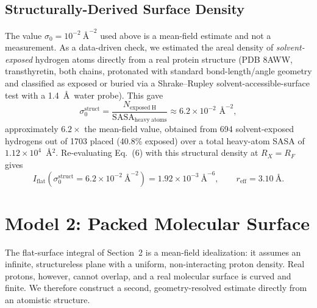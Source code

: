 \documentclass[11pt]{article}
\begin{document}
\subsection{Structurally-Derived Surface Density}
The value $\sigma_0 = 10^{-2}~\text{\AA}^{-2}$ used above is a mean-field estimate and not a measurement. As a data-driven check, we estimated the areal density of \emph{solvent-exposed} hydrogen atoms directly from a real protein structure (PDB 8AWW, transthyretin, both chains, protonated with standard bond-length/angle geometry and classified as exposed or buried via a Shrake--Rupley solvent-accessible-surface test with a 1.4~\AA\ water probe). This gave
\begin{equation}
\sigma_0^{\mathrm{struct}} = \frac{N_{\mathrm{exposed\ H}}}{\mathrm{SASA}_{\mathrm{heavy\ atoms}}} \approx 6.2 \times 10^{-2} \text{ \AA}^{-2},
\end{equation}
approximately $6.2\times$ the mean-field value, obtained from 694 solvent-exposed hydrogens out of 1703 placed (40.8\% exposed) over a total heavy-atom SASA of $1.12\times10^4$~\AA$^2$. Re-evaluating Eq.~(6) with this structural density at $R_X = R_F$ gives
\begin{equation}
I_{\mathrm{flat}}(\sigma_0^{\mathrm{struct}} = 6.2\times10^{-2}~\text{\AA}^{-2}) = 1.92\times10^{-3}~\text{\AA}^{-6}, \qquad r_{\mathrm{eff}} = 3.10~\text{\AA}.
\end{equation}

\section{Model 2: Packed Molecular Surface}
The flat-surface integral of Section~2 is a mean-field idealization: it assumes an infinite, structureless plane with a uniform, non-interacting proton density. Real protons, however, cannot overlap, and a real molecular surface is curved and finite. We therefore construct a second, geometry-resolved estimate directly from an atomistic structure.
\end{document}
